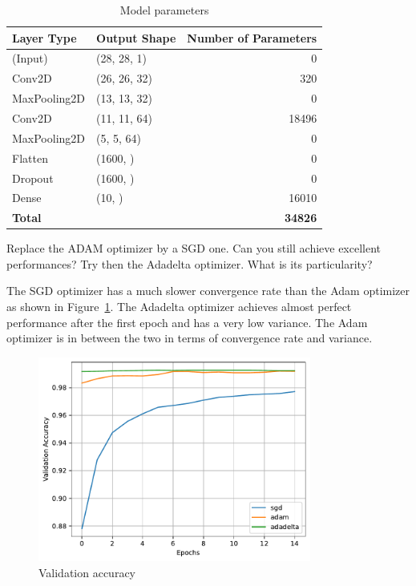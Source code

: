 \documentclass{article}
\newenvironment{task}[1]{
  \begin{tcolorbox}[
    colback=highlight!5!white,
    colframe=highlight,
    title={Task #1}
  ]
}{
  \end{tcolorbox}
}
\begin{document}
\begin{table}[ht!]
  \begin{tabular}{|l|l|r|}
    \hline
    \textbf{Layer Type} & \textbf{Output Shape} & \textbf{Number of Parameters} \\ \hline
    (Input)             & (28, 28, 1)           & 0                             \\ \hline
    Conv2D              & (26, 26, 32)          & 320                           \\ \hline
    MaxPooling2D        & (13, 13, 32)          & 0                             \\ \hline
    Conv2D              & (11, 11, 64)          & 18496                         \\ \hline
    MaxPooling2D        & (5, 5, 64)            & 0                             \\ \hline
    Flatten             & (1600, )              & 0                             \\ \hline
    Dropout             & (1600, )              & 0                             \\ \hline
    Dense               & (10, )                & 16010                         \\ \hline\hline
    \textbf{Total}      &                       & \textbf{34826}                \\ \hline
  \end{tabular}
  \centering
  \caption{Model parameters}
  \label{tab:ex1_model}
\end{table}


\begin{task}{1.3.6}
  Replace the ADAM optimizer by a SGD one. Can you still achieve excellent performances? Try then
  the Adadelta optimizer. What is its particularity?
\end{task}

The SGD optimizer has a much slower convergence rate than the Adam optimizer as shown in
Figure~\ref{fig:ex1_mnist_optimizers}. The Adadelta optimizer achieves almost perfect performance
after the first epoch and has a very low variance. The Adam optimizer is in between the two in terms
of convergence rate and variance.
\begin{figure}[ht!]
  \centering
  \includegraphics[width=0.8\textwidth]{ex1_mnist_optimizers.pdf}
  \caption{Validation accuracy}
  \label{fig:ex1_mnist_optimizers}
\end{figure}
\end{document}
